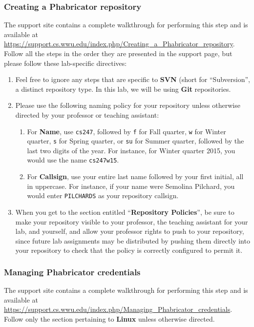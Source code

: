 \documentclass[12pt]{article}
\begin{document}
\subsubsection{Creating a Phabricator repository}
The support site contains a complete walkthrough for performing this step and is available at \url{https://support.cs.wwu.edu/index.php/Creating_a_Phabricator_repository}.  Follow all the steps in the order they are presented in the support page, but please follow these lab-specific directives:

	\begin{enumerate}
	\item Feel free to ignore any steps that are specific to \textbf{SVN} (short for ``Subversion'', a distinct repository type.  In this lab, we will be using \textbf{Git} repositories.

	\item Please use the following naming policy for your repository unless otherwise directed by your professor or teaching assistant:

		\begin{enumerate}
		\item For \textbf{Name}, use \verb|cs247|, followed by \verb|f| for Fall quarter, \verb|w| for Winter quarter, \verb|s| for Spring quarter, or \verb|su| for Summer quarter, followed by the last two digits of the year.  For instance, for Winter quarter 2015, you would use the name \verb|cs247w15|.

		\item For \textbf{Callsign}, use your entire last name followed by your first initial, all in uppercase.  For instance, if your name were Semolina Pilchard, you would enter \verb|PILCHARDS| as your repository callsign.
		\end{enumerate}

	\item When you get to the section entitled ``\textbf{Repository Policies}'', be sure to make your repository visible to your professor, the teaching assistant for your lab, and yourself, and allow your professor rights to push to your repository, since future lab assignments may be distributed by pushing them directly into your repository to check that the policy is correctly configured to permit it.
	\end{enumerate}

\subsubsection{Managing Phabricator credentials}
The support site contains a complete walkthrough for performing this step and is available at \url{https://support.cs.wwu.edu/index.php/Managing_Phabricator_credentials}.  Follow only the section pertaining to \textbf{Linux} unless otherwise directed.
\end{document}
